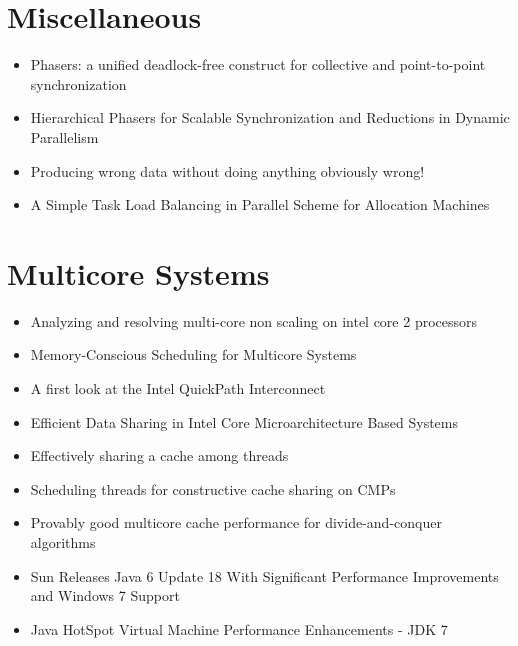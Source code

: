 \section*{Miscellaneous}
\label{sec:lr-miscellaneous}

\begin{itemize}
\item Phasers: a unified deadlock-free construct for collective and
  point-to-point synchronization \cite{Shirako2008}
\item Hierarchical Phasers for Scalable Synchronization and Reductions
  in Dynamic Parallelism \cite{Shirako2010}
\item Producing wrong data without doing anything obviously wrong!
  \cite{Mytkowicz2009}
\item A Simple Task Load Balancing in Parallel Scheme for Allocation
  Machines \cite{Rudolph1991}
\end{itemize}


\section*{Multicore Systems}
\label{sec:lr-multicore-systems}

\begin{itemize}
\item Analyzing and resolving multi-core non scaling on intel core 2
  processors \cite{Levinthal2007}
\item Memory-Conscious Scheduling for Multicore Systems \cite{Majo2010}
\item A first look at the Intel QuickPath Interconnect
  \cite{Maddox2009}
\item Efficient Data Sharing in Intel
  \textsuperscript{\textregistered} Core Microarchitecture Based
  Systems \cite{Shemer2007}
\item Effectively sharing a cache among threads \cite{Blelloch2004}
\item Scheduling threads for constructive cache sharing on CMPs
  \cite{Chen2007}
\item Provably good multicore cache performance for divide-and-conquer
  algorithms \cite{Blelloch2008}
\item[\checkmark] Sun Releases Java 6 Update 18 With Significant
  Performance Improvements and Windows 7 Support \cite{Humble2010}
\item[\checkmark] Java HotSpot Virtual Machine Performance
  Enhancements - JDK 7 \cite{Oracle2010}
\end{itemize}


